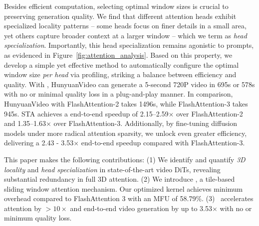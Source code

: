 Besides efficient computation, selecting optimal window sizes is crucial to preserving generation quality.
We find that different attention heads exhibit specialized locality patterns -- some heads focus on finer details in a small area, yet others capture broader context at a larger window -- which we term as \emph{head specialization}. Importantly, this head specialization remains agonistic to prompts, as evidenced in Figure~\ref{fig:attention_analysis}. Based on this property, we develop a simple yet effective method to automatically configure the optimal window size \emph{per head} via profiling, striking a balance between efficiency and quality.
With \methodnameshort, HunyuanVideo can generate a 5-second 720P video in 695s or 578s with no or minimal quality loss in a plug-and-play manner. In comparison, HunyuanVideo with FlashAttention-2 takes 1496s, while FlashAttention-3 takes 945s. STA achieves a end-to-end speedup of 2.15–2.59× over FlashAttention-2 and 1.35–1.63× over FlashAttention-3. Additionally, by fine-tuning diffusion models under more radical attention sparsity, we unlock even greater efficiency, delivering a 2.43 - 3.53$\times$ end-to-end speedup compared with FlashAttention-3.

This paper makes the following contributions: (1) We identify and quantify \textit{3D locality} and \textit{head specialization} in state-of-the-art video DiTs, revealing substantial redundancy in full 3D attention. (2) We introduce \methodname, a tile-based sliding window attention mechanism. Our optimized kernel achieves minimum overhead compared to FlashAttention 3 with an MFU of 58.79\%. (3) \methodnameshort~accelerates attention by $>10\times$ and end-to-end video generation by up to 3.53$\times$ with no or minimum quality loss.



